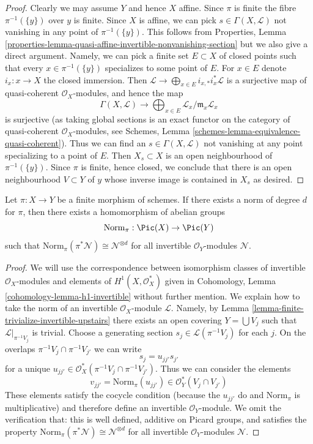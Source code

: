 \begin{proof}
Clearly we may assume $Y$ and hence $X$ affine. Since $\pi$ is finite the
fibre $\pi^{-1}(\{y\})$ over $y$ is finite.
Since $X$ is affine, we can pick $s \in \Gamma(X, \mathcal{L})$
not vanishing in any point of $\pi^{-1}(\{y\})$. This follows
from Properties, Lemma
\ref{properties-lemma-quasi-affine-invertible-nonvanishing-section}
but we also give a direct argument. Namely, we can
pick a finite set $E \subset X$ of closed points such that
every $x \in \pi^{-1}(\{y\})$ specializes to some point of $E$.
For $x \in E$ denote $i_x : x \to X$ the closed immersion.
Then
$\mathcal{L} \to \bigoplus_{x \in E} i_{x, *}i_x^*\mathcal{L}$
is a surjective map of quasi-coherent $\mathcal{O}_X$-modules,
and hence the map
$$
\Gamma(X, \mathcal{L}) \to
\bigoplus\nolimits_{x \in E} \mathcal{L}_x/\mathfrak m_x\mathcal{L}_x
$$
is surjective (as taking global sections is an exact functor on the
category of quasi-coherent $\mathcal{O}_X$-modules, see
Schemes, Lemma \ref{schemes-lemma-equivalence-quasi-coherent}).
Thus we can find an $s \in \Gamma(X, \mathcal{L})$
not vanishing at any point specializing to a point of $E$.
Then $X_s \subset X$ is an open neighbourhood of $\pi^{-1}(\{y\})$.
Since $\pi$ is finite, hence closed, we conclude that there is an
open neighbourhood $V \subset Y$ of $y$ whose inverse image
is contained in $X_s$ as desired.
\end{proof}

\begin{lemma}
\label{lemma-norm-invertible}
Let $\pi : X \to Y$ be a finite morphism of schemes. If there exists
a norm of degree $d$ for $\pi$, then there exists a homomorphism of
abelian groups
$$
\text{Norm}_\pi : \Pic(X) \to \Pic(Y)
$$
such that $\text{Norm}_\pi(\pi^*\mathcal{N}) \cong \mathcal{N}^{\otimes d}$
for all invertible $\mathcal{O}_Y$-modules $\mathcal{N}$.
\end{lemma}

\begin{proof}
We will use the correspondence between isomorphism classes of
invertible $\mathcal{O}_X$-modules and elements of
$H^1(X, \mathcal{O}_X^*)$ given in
Cohomology, Lemma \ref{cohomology-lemma-h1-invertible}
without further mention. We explain how to take the norm of an invertible
$\mathcal{O}_X$-module $\mathcal{L}$. Namely, by
Lemma \ref{lemma-finite-trivialize-invertible-upstairs}
there exists an open covering $Y = \bigcup V_j$ such that
$\mathcal{L}|_{\pi^{-1}V_j}$ is trivial. Choose a generating section
$s_j \in \mathcal{L}(\pi^{-1}V_j)$ for each $j$.
On the overlaps $\pi^{-1}V_j \cap \pi^{-1}V_{j'}$ we can write
$$
s_j = u_{jj'} s_{j'}
$$
for a unique $u_{jj'} \in \mathcal{O}^*_X(\pi^{-1}V_j \cap \pi^{-1}V_{j'})$.
Thus we can consider the elements
$$
v_{jj'} = \text{Norm}_\pi(u_{jj'}) \in \mathcal{O}_Y^*(V_j \cap V_{j'})
$$
These elements satisfy the cocycle condition (because the
$u_{jj'}$ do and $\text{Norm}_\pi$ is multiplicative) and
therefore define an invertible $\mathcal{O}_Y$-module.
We omit the verification that: this is well defined,
additive on Picard groups, and satisfies the property
$\text{Norm}_\pi(\pi^*\mathcal{N}) \cong \mathcal{N}^{\otimes d}$
for all invertible $\mathcal{O}_Y$-modules $\mathcal{N}$.
\end{proof}

